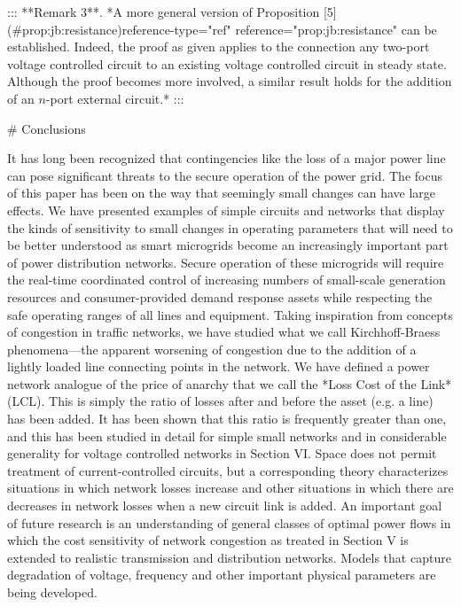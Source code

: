 ::: **Remark 3**. *A more general version of Proposition [5](#prop:jb:resistance){reference-type="ref" reference="prop:jb:resistance"} can be established. Indeed, the proof as given applies to the connection any two-port voltage controlled circuit to an existing voltage controlled circuit in steady state. Although the proof becomes more involved, a similar result holds for the addition of an $n$-port external circuit.* :::

# Conclusions

It has long been recognized that contingencies like the loss of a major power line can pose significant threats to the secure operation of the power grid. The focus of this paper has been on the way that seemingly small changes can have large effects. We have presented examples of simple circuits and networks that display the kinds of sensitivity to small changes in operating parameters that will need to be better understood as smart microgrids become an increasingly important part of power distribution networks. Secure operation of these microgrids will require the real-time coordinated control of increasing numbers of small-scale generation resources and consumer-provided demand response assets while respecting the safe operating ranges of all lines and equipment. Taking inspiration from concepts of congestion in traffic networks, we have studied what we call Kirchhoff-Braess phenomena---the apparent worsening of congestion due to the addition of a lightly loaded line connecting points in the network. We have defined a power network analogue of the price of anarchy that we call the *Loss Cost of the Link* (LCL). This is simply the ratio of losses after and before the asset (e.g. a line) has been added. It has been shown that this ratio is frequently greater than one, and this has been studied in detail for simple small networks and in considerable generality for voltage controlled networks in Section VI. Space does not permit treatment of current-controlled circuits, but a corresponding theory characterizes situations in which network losses increase and other situations in which there are decreases in network losses when a new circuit link is added. An important goal of future research is an understanding of general classes of optimal power flows in which the cost sensitivity of network congestion as treated in Section V is extended to realistic transmission and distribution networks. Models that capture degradation of voltage, frequency and other important physical parameters are being developed.

